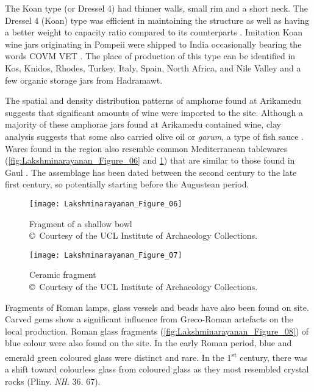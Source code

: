 The Koan type (or Dressel 4) had thinner walls, small rim and a short neck. The Dressel 4 (Koan) type was efficient in maintaining the structure as well as having a better weight to capacity ratio compared to its counterparts \parencites[][229]{empereur1989}[][117]{laubenheimer1990}. Imitation Koan wine jars originating in Pompeii were shipped to India occasionally bearing the words COVM VET \parencite[][263]{will2001}. The place of production of this type can be identified in Kos, Knidos, Rhodes, Turkey, Italy, Spain, North Africa, and Nile Valley and a few organic storage jars from Hadramawt.

The spatial and density distribution patterns of amphorae found at Arikamedu suggests that significant amounts of wine were imported to the site. Although a majority of these amphorae jars found at Arikamedu contained wine, clay analysis suggests that some also carried olive oil or \emph{garum}, a type of fish sauce \parencite[][150]{will1992a}. Wares found in the region also resemble common Mediterranean tablewares (\cref{fig:Lakshminarayanan_Figure_06} and \cref{fig:Lakshminarayanan_Figure_07}) that are similar to those found in Gaul \parencite[][69]{frakes2009}. The assemblage has been dated between the second century \BC to the late first century\AD, so potentially starting before the Augustean period.

\begin{figure}[!tb]
\begin{minipage}[b]{.49\linewidth}
	\texttt{[image: Lakshminarayanan\_Figure\_06]}
	\caption{Fragment of a shallow bowl\\
		{\normalfont\scriptsize\copyright\ Courtesy of the UCL Institute of Archaeology Collections.
	}}
	\label{fig:Lakshminarayanan_Figure_06}
\end{minipage}\hfill
\begin{minipage}[b]{.49\linewidth}
	\texttt{[image: Lakshminarayanan\_Figure\_07]}
	\caption{Ceramic fragment\\
		{\normalfont\scriptsize\copyright\ Courtesy of the UCL Institute of Archaeology Collections.
	}}
	\label{fig:Lakshminarayanan_Figure_07}
\end{minipage}
\end{figure}

Fragments of Roman lamps, glass vessels and beads have also been found on site. Carved gems show a significant influence from Greco-Roman artefacts on the local production. Roman glass fragments (\cref{fig:Lakshminarayanan_Figure_08}) of blue colour were also found on the site.  In the early Roman period, blue and emerald green coloured glass were distinct and rare. In the 1\textsuperscript{st} century\AD, there was a shift toward colourless glass from coloured glass as they most resembled crystal rocks (Pliny. \emph{NH}. 36. 67).


